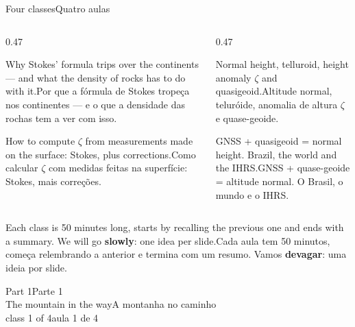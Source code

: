 \documentclass[aspectratio=169,11pt]{beamer}
\newcommand{\tr}[2]{\ifEN#2\else#1\fi}
\newcommand{\bnum}[1]{\textbf{\textcolor{mTeal}{#1}}}
\begin{document}
\begin{frame}{\tr{Quatro aulas}{Four classes}}
  \begin{columns}[T]
    \begin{column}{0.47\textwidth}
      \begin{regra}[title={\tr{Aula 1 · A montanha no caminho}{Class 1 · The mountain in the way}}]
        \small\tr{Por que a fórmula de Stokes tropeça nos continentes --- e o que a densidade
        das rochas tem a ver com isso.}{Why Stokes' formula trips over the continents --- and
        what the density of rocks has to do with it.}
      \end{regra}
      \vspace{2pt}
      \begin{regra}[title={\tr{Aula 3 · O problema de Molodensky}{Class 3 · Molodensky's
        problem}}]
        \small\tr{Como calcular $\zeta$ com medidas feitas na superfície: Stokes, mais
        correções.}{How to compute $\zeta$ from measurements made on the surface: Stokes, plus
        corrections.}
      \end{regra}
    \end{column}
    \begin{column}{0.47\textwidth}
      \begin{regra}[title={\tr{Aula 2 · Uma altura sem densidade}{Class 2 · A height without
        density}}]
        \small\tr{Altitude normal, teluróide, anomalia de altura $\zeta$ e
        quase-geoide.}{Normal height, telluroid, height anomaly $\zeta$ and quasigeoid.}
      \end{regra}
      \vspace{2pt}
      \begin{regra}[title={\tr{Aula 4 · Na prática}{Class 4 · In practice}}]
        \small\tr{GNSS + quase-geoide = altitude normal. O Brasil, o mundo e o
        IHRS.}{GNSS + quasigeoid = normal height. Brazil, the world and the IHRS.}
      \end{regra}
    \end{column}
  \end{columns}
  \medskip
  \centering
  \tr{Cada aula tem 50 minutos, começa relembrando a anterior e termina com um resumo.
  Vamos \bnum{devagar}: uma ideia por slide.}{Each class is 50 minutes long, starts by
  recalling the previous one and ends with a summary. We will go \bnum{slowly}: one idea per
  slide.}
\end{frame}

\begin{frame}[standout]
  \tr{Parte 1}{Part 1}\\[6pt]
  {\normalsize \tr{A montanha no caminho}{The mountain in the way}}\\[4pt]
  {\scriptsize \tr{aula 1 de 4}{class 1 of 4}}
\end{frame}
\end{document}
